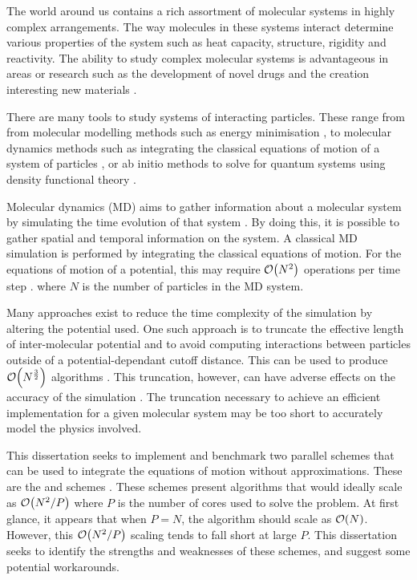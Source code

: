 %
%

%
The world around us contains
a rich assortment of molecular systems in
highly complex arrangements.
%
The way molecules in these systems interact determine various properties
of the system such as heat capacity, structure, rigidity and reactivity.
%
The ability to study complex molecular systems
is advantageous in areas or research
such as the development of novel drugs
\cite{perryman2004hiv} and
the creation interesting new materials \cite{rao2001science}.

%
There are many tools to study systems of interacting particles.
These range from from molecular modelling methods such as
energy minimisation \cite[p.~306]{schlick2010molecular},
to molecular dynamics methods such as 
integrating the classical equations of motion of a
system of particles
\cite[p.~71]{frenkel2001understanding},
or ab initio methods to solve for quantum systems
using density functional theory \cite{parr1995density}.


%
Molecular dynamics (MD) aims to
gather information about a molecular system by
simulating the time evolution of that system
\cite[p.~63]{frenkel2001understanding}.
%
By doing this, it is possible to
gather spatial and temporal information on the system.
%
A classical MD simulation is performed by integrating
the classical equations of motion.
%
For the equations of motion of a \twobody{} potential,
this may require $\mathcal{O}{\left({ N^2 }\right)}$ operations per time step
\cite[p.~67]{frenkel2001understanding}.
where $N$ is the number of particles in the MD system.


Many approaches exist to reduce the time complexity of
the simulation by altering the potential used.
%
One such approach is to truncate the effective length of inter-molecular
potential and to avoid computing interactions between particles outside of a
potential-dependant cutoff distance.
%
This can be used to produce $\mathcal{O}{\left({ N^{\frac{3}{2}} }\right)}$ algorithms
\cite[p.~545]{frenkel2001understanding}.
%
This truncation, however, can have adverse effects on the accuracy
of the simulation \cite{patra2003molecular}.
%
The truncation necessary to achieve an efficient implementation
for a given molecular system may be
too short to accurately model the physics involved.

%
This dissertation seeks to implement and benchmark two parallel schemes
that can be used to integrate the equations of motion without
approximations.
%
These are the \replicateddata{} and \systolicloop{} schemes
\cite{smith1991molecular}.
%
These schemes present algorithms that would ideally scale as $\mathcal{O}{\left({ N^2/P }\right)}$
where $P$ is the number of cores used to solve the problem.
%
At first glance, it appears that when $P = N$, the algorithm should
scale as $\mathcal{O}{\left({ N }\right)}$.
%
However, this $\mathcal{O}{\left({ N^2/P }\right)}$ scaling tends to fall short at large $P$.
%
This dissertation seeks to identify the strengths and weaknesses of
these schemes, and suggest some potential workarounds.


